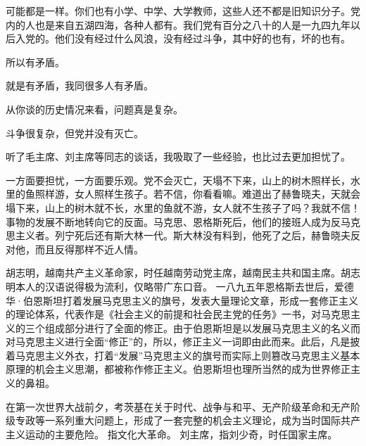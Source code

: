 可能都是一样。你们也有小学、中学、大学教师，这些人还不都是旧知识分子。党内的人也是来自五湖四海，各种人都有。我们党有百分之八十的人是一九四九年以后入党的。他们没有经过什么风浪，没有经过斗争，其中好的也有，坏的也有。

所以有矛盾。

就是有矛盾，我同很多人有矛盾。

从你谈的历史情况来看，问题真是复杂。

斗争很复杂，但党并没有灭亡。

听了毛主席、刘主席等同志的谈话，我吸取了一些经验，也比过去更加担忧了。

一方面要担忧，一方面要乐观。党不会灭亡，天塌不下来，山上的树木照样长，水里的鱼照样游，女人照样生孩子。若不信，你看看嘛。难道出了赫鲁晓夫，天就会塌下来，山上的树木就不长，水里的鱼就不游，女人就不生孩子了吗？我就不信！事物的发展不断地转向它的反面。马克思、恩格斯死后，他们的接班人成为反马克思主义者。列宁死后还有斯大林一代。斯大林没有料到，他死了之后，赫鲁晓夫反对他，而且反得那样不近人情。

\begin{maonote}
胡志明，越南共产主义革命家，时任越南劳动党主席，越南民主共和国主席。胡志明本人的汉语说得极为流利，仅略带广东口音。
一八九五年恩格斯去世后，爱德华·伯恩斯坦打着发展马克思主义的旗号，发表大量理论文章，形成一套修正主义的理论体系，代表作是《社会主义的前提和社会民主党的任务》一书，对马克思主义的三个组成部分进行了全面的修正。由于伯恩斯坦是以发展马克思主义的名义而对马克思主义进行全面“修正”的，所以，修正主义一词即由此而来。此后，凡是披着马克思主义外衣，打着“发展”马克思主义的旗号而实际上则篡改马克思主义基本原理的机会主义思潮，都被称作修正主义。伯恩斯坦也理所当然的成为世界修正主义的鼻祖。

在第一次世界大战前夕，考茨基在关于时代、战争与和平、无产阶级革命和无产阶级专政等一系列重大问题上，形成了一套完整的机会主义理论，成为当时国际共产主义运动的主要危险。
指文化大革命。
刘主席，指刘少奇，时任国家主席。
\end{maonote}
